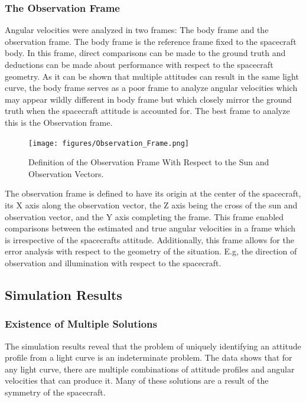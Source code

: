 \subsubsection{The Observation Frame}

Angular velocities were analyzed in two frames: The body frame and the observation frame. The body frame is the reference frame fixed to the spacecraft body. In this frame, direct comparisons can be made to the ground truth and deductions can be made about performance with respect to the spacecraft geometry. As it can be shown that multiple attitudes can result in the same light curve, the body frame serves as a poor frame to analyze angular velocities which may appear wildly different in body frame but which closely mirror the ground truth when the spacecraft attitude is accounted for. The best frame to analyze this is the Observation frame.

\begin{figure}[ht] \label{body errors}
	\begin{center}
		\texttt{[image: figures/Observation\_Frame.png]}
		\caption{Definition of the Observation Frame With Respect to the Sun and Observation Vectors.}
	\end{center}
\end{figure}

The observation frame is defined to have its origin at the center of the spacecraft, its X axis along the observation vector, the Z axis being the cross of the sun and observation vector, and the Y axis completing the frame. This frame enabled comparisons between the estimated and true angular velocities in a frame which is irrespective of the spacecrafts attitude. Additionally, this frame allows for the error analysis with respect to the geometry of the situation. E.g, the direction of observation and illumination with respect to the spacecraft.

\subsection{Simulation Results}

\subsubsection{Existence of Multiple Solutions}
The simulation results reveal that the problem of uniquely identifying an attitude profile from a light curve is an indeterminate problem. The data shows that for any light curve, there are multiple combinations of attitude profiles and angular velocities that can produce it. Many of these solutions are a result of the symmetry of the spacecraft. 

